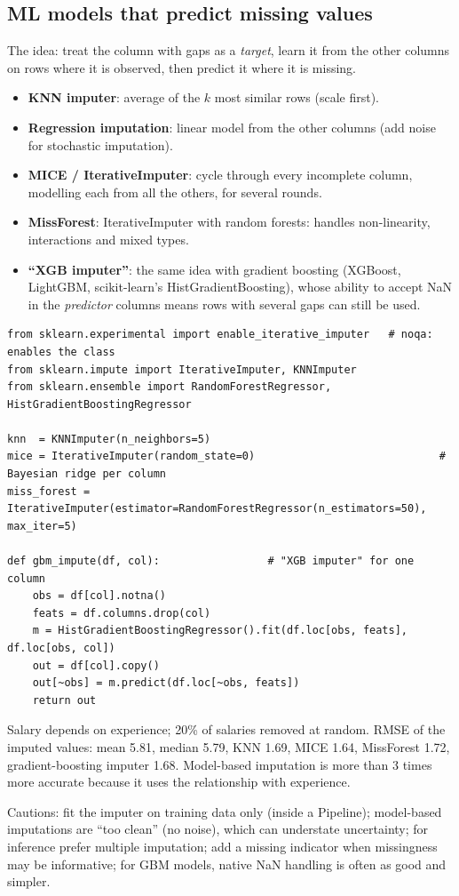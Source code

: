 \subsection{ML models that predict missing values}
The idea: treat the column with gaps as a \emph{target}, learn it from the other columns on rows where it is observed, then predict it where it is missing.
\begin{itemize}
\item \textbf{KNN imputer}: average of the $k$ most similar rows (scale first).
\item \textbf{Regression imputation}: linear model from the other columns (add noise for stochastic imputation).
\item \textbf{MICE / IterativeImputer}: cycle through every incomplete column, modelling each from all the others, for several rounds.
\item \textbf{MissForest}: IterativeImputer with random forests: handles non-linearity, interactions and mixed types.
\item \textbf{``XGB imputer''}: the same idea with gradient boosting (XGBoost, LightGBM, scikit-learn's HistGradientBoosting), whose ability to accept NaN in the
  \emph{predictor} columns means rows with several gaps can still be used.
\end{itemize}
\begin{lstlisting}
from sklearn.experimental import enable_iterative_imputer   # noqa: enables the class
from sklearn.impute import IterativeImputer, KNNImputer
from sklearn.ensemble import RandomForestRegressor, HistGradientBoostingRegressor

knn  = KNNImputer(n_neighbors=5)
mice = IterativeImputer(random_state=0)                             # Bayesian ridge per column
miss_forest = IterativeImputer(estimator=RandomForestRegressor(n_estimators=50), max_iter=5)

def gbm_impute(df, col):                 # "XGB imputer" for one column
    obs = df[col].notna()
    feats = df.columns.drop(col)
    m = HistGradientBoostingRegressor().fit(df.loc[obs, feats], df.loc[obs, col])
    out = df[col].copy()
    out[~obs] = m.predict(df.loc[~obs, feats])
    return out
\end{lstlisting}
\begin{example}
Salary depends on experience; 20\% of salaries removed at random. RMSE of the imputed values: mean 5.81, median 5.79, KNN 1.69, MICE 1.64, MissForest 1.72,
gradient-boosting imputer 1.68. Model-based imputation is more than 3 times more accurate because it uses the relationship with experience.
\end{example}
Cautions: fit the imputer on training data only (inside a Pipeline); model-based imputations are ``too clean'' (no noise), which can understate uncertainty; for
inference prefer multiple imputation; add a missing indicator when missingness may be informative; for GBM models, native NaN handling is often as good and simpler.

